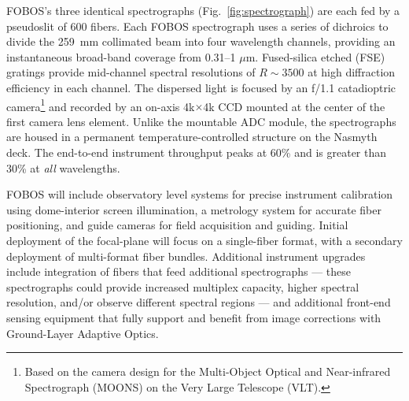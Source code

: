 FOBOS's three identical spectrographs (Fig.~\ref{fig:spectrograph})
are each fed by a pseudoslit of 600 fibers. Each FOBOS spectrograph
uses a series of dichroics to divide the 259~mm collimated beam into
four wavelength channels, providing an instantaneous broad-band
coverage from 0.31--1 $\mu$m. Fused-silica etched (FSE) gratings
provide mid-channel spectral resolutions of $R\sim3500$ at high
diffraction efficiency in each channel. The dispersed light is
focused by an f/1.1 catadioptric camera\footnote{Based on the camera
design for the Multi-Object Optical and Near-infrared Spectrograph
(MOONS) on the Very Large Telescope (VLT).} and recorded by an
on-axis 4k$\times$4k CCD mounted at the center of the first camera
lens element. Unlike the mountable ADC module, the spectrographs are
housed in a permanent temperature-controlled structure on the Nasmyth
deck. The end-to-end instrument throughput peaks at 60\% and is
greater than 30\% at {\it all} wavelengths.

FOBOS will include observatory level systems for precise instrument
calibration using dome-interior screen illumination, a metrology system
for accurate fiber positioning, and guide cameras for field acquisition
and guiding.  Initial deployment of the focal-plane will focus on a
single-fiber format, with a secondary deployment of multi-format fiber
bundles. Additional instrument upgrades include integration of
fibers that feed additional spectrographs --- these spectrographs could
provide increased multiplex capacity, higher spectral resolution, and/or
observe different spectral regions --- and additional front-end sensing
equipment that fully support and benefit from image corrections with
Ground-Layer Adaptive Optics.

